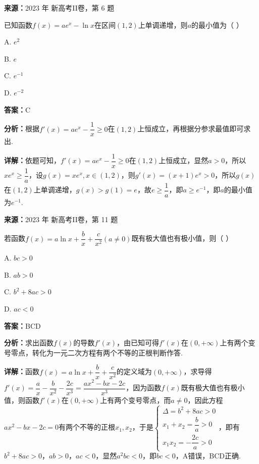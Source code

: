 \begin{question}[points=5]
\textbf{来源：}2023 年 新高考II卷，第 6 题\par
已知函数$f(x)=ae^{x}-\ln x$在区间$(1,2)$上单调递增，则$a$的最小值为（ \quad ）
\begin{choices}
  \item A. $e^{2}$
  \item B. $e$
  \item C. $e^{-1}$
  \item D. $e^{-2}$
\end{choices}
\begin{solution}
\textbf{答案：}C

\textbf{分析：}根据$f'(x)=ae^{x}-\dfrac{1}{x}\ge0$在$(1,2)$上恒成立，再根据分参求最值即可求出.

\textbf{详解：}依题可知，$f'(x)=ae^{x}-\dfrac{1}{x}\ge0$在$(1,2)$上恒成立，显然$a>0$，所以$xe^{x}\ge\dfrac{1}{a}$，设$g(x)=xe^{x},x\in(1,2)$，则$g'(x)=(x+1)e^{x}>0$，所以$g(x)$在$(1,2)$上单调递增，$g(x)>g(1)=e$，故$e\ge\dfrac{1}{a}$，即$a\ge e^{-1}$，即$a$的最小值为$e^{-1}$.
\end{solution}
\end{question}

\begin{question}[points=5]
\textbf{来源：}2023 年 新高考II卷，第 11 题\par
若函数$f(x)=a\ln x+\dfrac{b}{x}+\dfrac{c}{x^{2}}(a\neq0)$既有极大值也有极小值，则（ \quad ）
\begin{choices}
  \item A. $bc>0$
  \item B. $ab>0$
  \item C. $b^{2}+8ac>0$
  \item D. $ac<0$
\end{choices}
\begin{solution}
\textbf{答案：}BCD

\textbf{分析：}求出函数$f(x)$的导数$f'(x)$，由已知可得$f'(x)$在$(0,+\infty)$上有两个变号零点，转化为一元二次方程有两个不等的正根判断作答.

\textbf{详解：}函数$f(x)=a\ln x+\dfrac{b}{x}+\dfrac{c}{x^{2}}$的定义域为$(0,+\infty)$，求导得$f'(x)=\dfrac{a}{x}-\dfrac{b}{x^{2}}-\dfrac{2c}{x^{3}}=\dfrac{ax^{2}-bx-2c}{x^{3}}$，因为函数$f(x)$既有极大值也有极小值，则函数$f'(x)$在$(0,+\infty)$上有两个变号零点，而$a\neq0$，因此方程$ax^{2}-bx-2c=0$有两个不等的正根$x_{1},x_{2}$，于是$\begin{cases}\Delta=b^{2}+8ac>0\\ x_{1}+x_{2}=\dfrac{b}{a}>0\\ x_{1}x_{2}=-\dfrac{2c}{a}>0\end{cases}$，即有$b^{2}+8ac>0$，$ab>0$，$ac<0$，显然$a^{2}bc<0$，即$bc<0$，A错误，BCD正确.
\end{solution}
\end{question}

